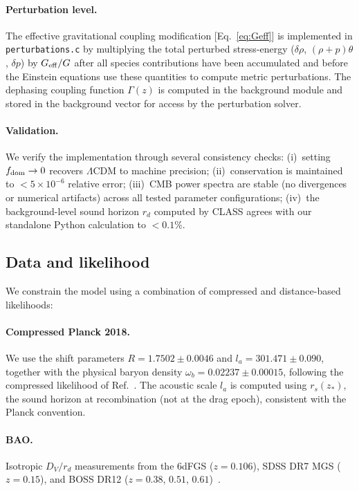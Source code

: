 \documentclass[aps,prd,twocolumn,superscriptaddress,nofootinbib]{revtex4-2}
\newcommand{\fdom}{f_{\rm dom}}
\newcommand{\Geff}{G_{\rm eff}}
\begin{document}
\paragraph{Perturbation level.}
The effective gravitational coupling modification
[Eq.~\eqref{eq:Geff}] is implemented in \texttt{perturbations.c} by
multiplying the total perturbed stress-energy ($\delta\rho$,
$(\rho+p)\theta$, $\delta p$) by $\Geff/G$ after all species
contributions have been accumulated and before the Einstein equations
use these quantities to compute metric perturbations. The dephasing
coupling function $\Gamma(z)$ is computed in the background module and
stored in the background vector for access by the perturbation solver.

\paragraph{Validation.}
We verify the implementation through several consistency checks:
(i)~setting $\fdom \to 0$ recovers $\Lambda$CDM to machine precision;
(ii)~conservation is maintained to $< 5 \times 10^{-6}$ relative
error;
(iii)~CMB power spectra are stable (no divergences or numerical
artifacts) across all tested parameter configurations;
(iv)~the background-level sound horizon $r_d$ computed by CLASS
agrees with our standalone Python calculation to $< 0.1\%$.

\subsection{Data and likelihood}

We constrain the model using a combination of compressed and
distance-based likelihoods:

\paragraph{Compressed Planck 2018.}
We use the shift parameters $R = 1.7502 \pm 0.0046$ and
$l_a = 301.471 \pm 0.090$, together with the physical baryon density
$\omega_b = 0.02237 \pm 0.00015$, following the compressed likelihood
of Ref.~\cite{Efstathiou2019}. The acoustic scale $l_a$ is computed
using $r_s(z_*)$, the sound horizon at recombination (not at the drag
epoch), consistent with the Planck convention.

\paragraph{BAO.}
Isotropic $D_V/r_d$ measurements from the 6dFGS ($z = 0.106$),
SDSS DR7 MGS ($z = 0.15$), and BOSS DR12 ($z = 0.38$, $0.51$,
$0.61$)~\cite{Beutler2011,Ross2015,BOSS2017}.
\end{document}
